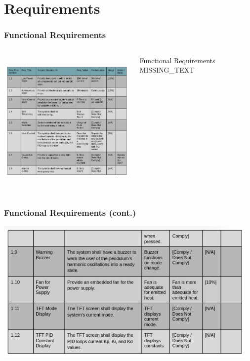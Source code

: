 \documentclass[aspectratio=169]{beamer}
\begin{document}
\section{Requirements}
\begin{frame}
    \frametitle{Functional Requirements}

    \begin{columns}
        \begin{column}{0.70\textwidth}
            \includegraphics[height=7cm]{Functional1}
        \end{column}

        \begin{column}{0.28\textwidth}
            \begin{block}{Functional Requirements}
                MISSING\_TEXT
            \end{block}
        \end{column}
    \end{columns}

\end{frame}

\begin{frame}
    \frametitle{Functional Requirements (cont.)}

    \includegraphics[height=7cm]{Functional2}
\end{frame}
\end{document}
